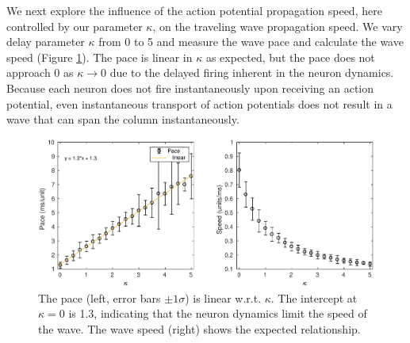 \FloatBarrier

We next explore the influence of the action potential propagation speed, here controlled by our parameter $\kappa$, on the traveling wave propagation speed.
We vary delay parameter $\kappa$ from 0 to 5 and measure the wave pace and calculate the wave speed (Figure \ref{fig:delay_speed}).
The pace is linear in $\kappa$ as expected, but the pace does not approach $0$ as $\kappa \rightarrow 0$ due to the delayed firing inherent in the neuron dynamics.
Because each neuron does not fire instantaneously upon receiving an action potential, even instantaneous transport of action potentials does not result in a wave that can span the column instantaneously.
\begin{figure}[!htb]
 \centering
   \includegraphics[width=\textwidth]{fig/WaveSpeed_Delay}
   \caption{The pace (left, error bars $\pm 1 \sigma$) is linear w.r.t. $\kappa$. The intercept at $\kappa=0$ is 1.3, indicating that the neuron dynamics limit the speed of the wave. 
	  The wave speed (right) shows the expected relationship. }
    \label{fig:delay_speed}
\end{figure}
\FloatBarrier

